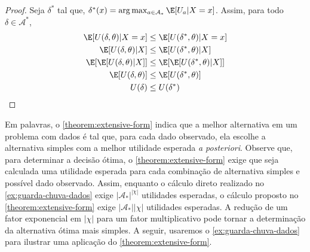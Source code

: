 \begin{proof}
 Seja $\delta^*$ tal que,  
 $\delta^{*}(x) = \arg\max_{a \in \mathcal{A}_{*}}\E[U_{a}|X=x]$.
 Assim, para todo $\delta \in \mathcal{A}^*$,
 \begin{align*}
  \E[U(\delta,\theta)|X=x]
  &\leq \E[U(\delta^*,\theta)|X=x] \\
  \E[U(\delta,\theta)|X]
  &\leq \E[U(\delta^*,\theta)|X] \\
  \E[\E[U(\delta,\theta)|X]]
  &\leq \E[\E[U(\delta^*,\theta)|X]] \\
  \E[U(\delta,\theta)]
  &\leq \E[U(\delta^*,\theta)] \\
  U(\delta) &\leq U(\delta^*)
 \end{align*}
\end{proof}

Em palavras, o \cref{theorem:extensive-form} indica que
a melhor alternativa em um problema com dados é
tal que, para cada dado observado, ela escolhe a
alternativa simples com a melhor utilidade esperada
\emph{a posteriori}. Observe que, para determinar a
decisão ótima, o \cref{theorem:extensive-form} exige que
seja calculada uma utilidade esperada para cada
combinação de alternativa simples e possível dado observado. Assim, enquanto o cálculo direto
realizado no \cref{ex:guarda-chuva-dados}
exige $|\mathcal{A}_{*}|^{|\chi|}$ utilidades esperadas,
o cálculo proposto no \cref{theorem:extensive-form} exige
$|\mathcal{A}_{*}||\chi|$ utilidades esperadas.
A redução de um fator exponencial em $|\chi|$ para um
fator multiplicativo pode tornar a determinação da
alternativa ótima mais simples.
A seguir, usaremos o \cref{ex:guarda-chuva-dados} para 
ilustrar uma aplicação do \cref{theorem:extensive-form}.

